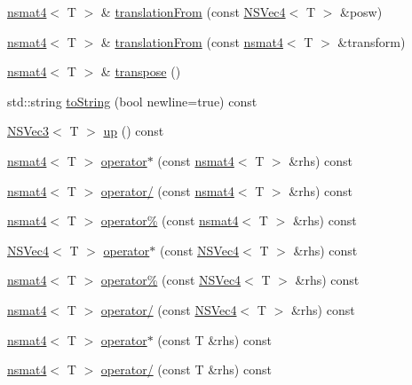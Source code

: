 \begin{DoxyCompactItemize}
\item 
\hyperlink{structnsmat4}{nsmat4}$<$ T $>$ \& \hyperlink{structnsmat4_a75161fbb63e1b32403331c88ba604c80}{translation\-From} (const \hyperlink{structNSVec4}{N\-S\-Vec4}$<$ T $>$ \&posw)
\item 
\hyperlink{structnsmat4}{nsmat4}$<$ T $>$ \& \hyperlink{structnsmat4_a04a8693e5db8b2e038189af89855f7ae}{translation\-From} (const \hyperlink{structnsmat4}{nsmat4}$<$ T $>$ \&transform)
\item 
\hyperlink{structnsmat4}{nsmat4}$<$ T $>$ \& \hyperlink{structnsmat4_a2fe21f0f54bbfc977bd3c6ca2dbaf0a9}{transpose} ()
\item 
std\-::string \hyperlink{structnsmat4_a452a0723649f236e1fa44cb152e7a744}{to\-String} (bool newline=true) const 
\item 
\hyperlink{structNSVec3}{N\-S\-Vec3}$<$ T $>$ \hyperlink{structnsmat4_a59f27ef8ea585de9a12f18727ba9cb34}{up} () const 
\item 
\hyperlink{structnsmat4}{nsmat4}$<$ T $>$ \hyperlink{structnsmat4_ab5673976a8d1f1933f256e75e3c069d4}{operator$\ast$} (const \hyperlink{structnsmat4}{nsmat4}$<$ T $>$ \&rhs) const 
\item 
\hyperlink{structnsmat4}{nsmat4}$<$ T $>$ \hyperlink{structnsmat4_a745faa59b32237850ac95e42af7db864}{operator/} (const \hyperlink{structnsmat4}{nsmat4}$<$ T $>$ \&rhs) const 
\item 
\hyperlink{structnsmat4}{nsmat4}$<$ T $>$ \hyperlink{structnsmat4_a36963ec00a3324958525d3dc4a5b5cb4}{operator\%} (const \hyperlink{structnsmat4}{nsmat4}$<$ T $>$ \&rhs) const 
\item 
\hyperlink{structNSVec4}{N\-S\-Vec4}$<$ T $>$ \hyperlink{structnsmat4_a14066b1cab39d37873d2625dc8aa6f29}{operator$\ast$} (const \hyperlink{structNSVec4}{N\-S\-Vec4}$<$ T $>$ \&rhs) const 
\item 
\hyperlink{structnsmat4}{nsmat4}$<$ T $>$ \hyperlink{structnsmat4_ad4a57bd10b2b7add7981aed7d2a485f5}{operator\%} (const \hyperlink{structNSVec4}{N\-S\-Vec4}$<$ T $>$ \&rhs) const 
\item 
\hyperlink{structnsmat4}{nsmat4}$<$ T $>$ \hyperlink{structnsmat4_a5d8d6d2051cfb385aac550a0a621e478}{operator/} (const \hyperlink{structNSVec4}{N\-S\-Vec4}$<$ T $>$ \&rhs) const 
\item 
\hyperlink{structnsmat4}{nsmat4}$<$ T $>$ \hyperlink{structnsmat4_ac62d646fdb8278ff595995aaa62d72df}{operator$\ast$} (const T \&rhs) const 
\item 
\hyperlink{structnsmat4}{nsmat4}$<$ T $>$ \hyperlink{structnsmat4_a9ca0035522d1ae984f8fe5067e01300c}{operator/} (const T \&rhs) const 

\end{DoxyCompactItemize}
